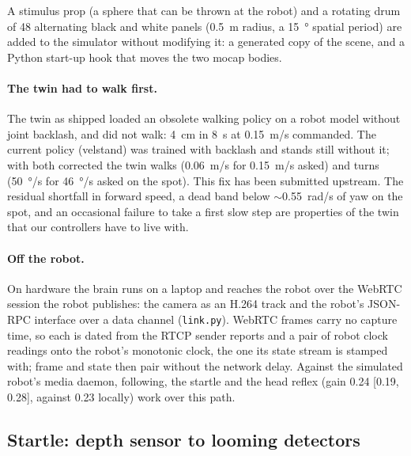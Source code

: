 \documentclass[10pt,a4paper]{article}
\begin{document}
A stimulus prop (a sphere that can be thrown at the robot) and a rotating drum of 48 alternating black and
white panels (\SI{0.5}{m} radius, a \SI{15}{\degree} spatial period) are added to the simulator without
modifying it: a generated copy of the scene, and a Python start-up hook that moves the two mocap bodies.

\paragraph{The twin had to walk first.} The twin as shipped loaded an obsolete walking policy on a robot
model without joint backlash, and did not walk: \SI{4}{cm} in \SI{8}{s} at \SI{0.15}{m/s} commanded.
The current policy (velstand) was trained with backlash and stands still without it; with both corrected
the twin walks (\SI{0.06}{m/s} for \SI{0.15}{m/s} asked) and turns (\SI{50}{\degree/s} for
\SI{46}{\degree/s} asked on the spot). This fix has been submitted upstream. The residual shortfall in
forward speed, a dead band below $\sim$\SI{0.55}{rad/s} of yaw on the spot, and an occasional failure to
take a first slow step are properties of the twin that our controllers have to live with.

\paragraph{Off the robot.} On hardware the brain runs on a laptop and reaches the robot over the
WebRTC session the robot publishes: the camera as an H.264 track and the robot's JSON-RPC interface
over a data channel (\texttt{link.py}). WebRTC frames carry no capture time, so each is dated from
the RTCP sender reports and a pair of robot clock readings onto the robot's monotonic clock, the one
its state stream is stamped with; frame and state then pair without the network delay. Against the
simulated robot's media daemon, following, the startle and the head reflex (gain 0.24 [0.19, 0.28],
against 0.23 locally) work over this path.

\subsection{Startle: depth sensor to looming detectors}
\end{document}
